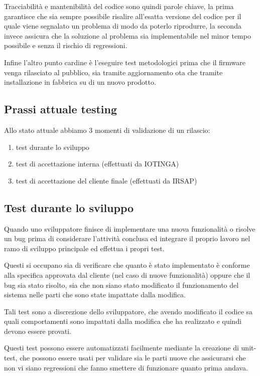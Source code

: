 \documentclass[12pt,a4paper,twoside,titlepage]{book}
\begin{document}
Tracciabilità e mantenibilità del codice sono quindi parole chiave, la prima garantisce che
sia sempre possibile risalire all'esatta versione del codice per il quale viene segnalato un
problema di modo da poterlo riprodurre, la seconda invece assicura che la soluzione al problema
sia implementabile nel minor tempo possibile e senza il rischio di regressioni.

Infine l'altro punto cardine è l'eseguire test metodologici prima che il \gls{firmware} venga
rilasciato al pubblico, sia tramite aggiornamento \acrshort{ota} che tramite installazione in fabbrica
su di un nuovo prodotto.

\subsection{Prassi attuale testing}

Allo stato attuale abbiamo 3 momenti di validazione di un rilascio:

\begin{enumerate}
    \item test durante lo sviluppo
    \item test di accettazione interna (effettuati da IOTINGA)
    \item test di accettazione del cliente finale (effettuati da IRSAP)
\end{enumerate}

\subsection{Test durante lo sviluppo}

Quando uno sviluppatore finisce di implementare una nuova funzionalità o risolve un
bug  prima di considerare l'attività conclusa ed integrare il
proprio lavoro nel ramo di sviluppo principale ed effettua i propri test.

Questi si occupano sia di verificare che quanto è stato implementato è conforme
alla specifica approvata dal cliente (nel caso di nuove funzionalità) oppure che
il bug sia stato risolto, sia che non siano stato modificato il funzionamento del sistema
nelle parti che sono state impattate dalla modifica.

Tali test sono a discrezione dello sviluppatore, che avendo modificato il codice sa
quali comportamenti sono impattati dalla modifica che ha realizzato e quindi devono essere
provati.

Questi test possono essere automatizzati facilmente mediante la creazione di unit-test,
che possono essere usati per validare sia le parti nuove che assicurarsi che non vi siano
regressioni che fanno smettere di funzionare quanto prima andava.
\end{document}
